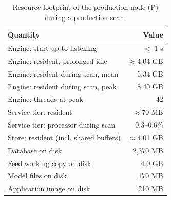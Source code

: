 \begin{table}[htbp]
\centering
\caption{Resource footprint of the production node (P) during a production scan.}
\label{tab:footprint}
\footnotesize
\begin{tabular}{l r}
\hline
Quantity & Value \\
\hline
Engine: start-up to listening & $<$ 1 s \\
Engine: resident, prolonged idle & $\approx$4.04 GB \\
Engine: resident during scan, mean & 5.34 GB \\
Engine: resident during scan, peak & 8.40 GB \\
Engine: threads at peak & 42 \\
Service tier: resident & $\approx$70 MB \\
Service tier: processor during scan & 0.3--0.6\% \\
Store: resident (incl. shared buffers) & $\approx$4.01 GB \\
Database on disk & 2,370 MB \\
Feed working copy on disk & 4.0 GB \\
Model files on disk & 170 MB \\
Application image on disk & 210 MB \\
\hline
\end{tabular}
\end{table}
